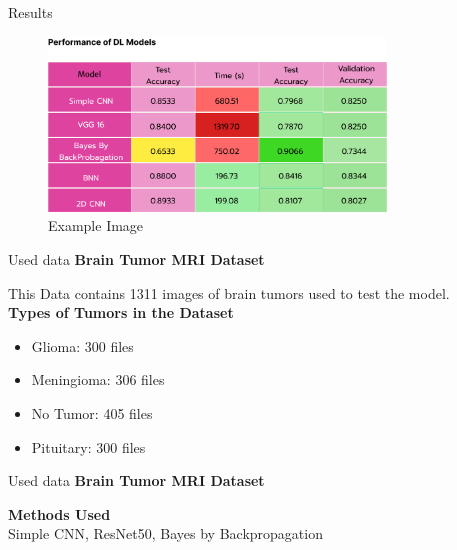 \documentclass[aspectratio=169,xcolor=dvipsnames, t]{beamer}
\begin{document}
\begin{frame}{Results}
   \begin{figure}[h]
    \centering
    \includegraphics[width=0.8\textwidth]{images/table1.png}
    \caption{Example Image}
    \label{fig:example}
\end{figure}

\end{frame}




\begin{frame}{Used data}
\textbf{Brain Tumor MRI Dataset}

 This Data contains 1311 images of brain tumors used to test the model. \\
    \vspace{0.5em}
    \textbf{Types of Tumors in the Dataset} \\
    \begin{itemize}
        \item Glioma: 300 files
        \item Meningioma: 306 files
        \item No Tumor: 405 files
        \item Pituitary: 300 files
    \end{itemize}
    \vspace{0.5em}

\end{frame}

\begin{frame}{Used data}
\textbf{Brain Tumor MRI Dataset}

 \textbf{Methods Used} \\
    Simple CNN, ResNet50, Bayes by Backpropagation

\end{frame}
\end{document}
